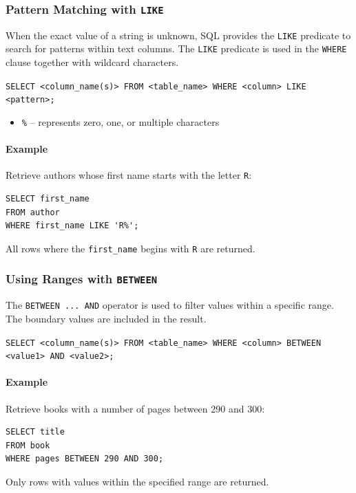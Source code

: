 \documentclass{article}
\begin{document}
\subsubsection{Pattern Matching with \texttt{LIKE}}
When the exact value of a string is unknown, SQL provides the \texttt{LIKE} predicate to search for patterns within text columns.  
The \texttt{LIKE} predicate is used in the \texttt{WHERE} clause together with wildcard characters.

\begin{FormulaBox}
\texttt{SELECT <column\_name(s)> FROM <table\_name> WHERE <column> LIKE <pattern>;}
\end{FormulaBox}

\begin{itemize}
    \item \texttt{\%} – represents zero, one, or multiple characters
\end{itemize}

\paragraph{Example}
Retrieve authors whose first name starts with the letter \texttt{R}:
\begin{verbatim}
SELECT first_name
FROM author
WHERE first_name LIKE 'R%';
\end{verbatim}
All rows where the \texttt{first\_name} begins with \texttt{R} are returned.

\subsubsection{Using Ranges with \texttt{BETWEEN}}
The \texttt{BETWEEN ... AND} operator is used to filter values within a specific range.  
The boundary values are included in the result.

\begin{FormulaBox}
\texttt{SELECT <column\_name(s)> FROM <table\_name> WHERE <column> BETWEEN <value1> AND <value2>;}
\end{FormulaBox}

\paragraph{Example}
Retrieve books with a number of pages between 290 and 300:
\begin{verbatim}
SELECT title
FROM book
WHERE pages BETWEEN 290 AND 300;
\end{verbatim}
Only rows with values within the specified range are returned.
\end{document}
